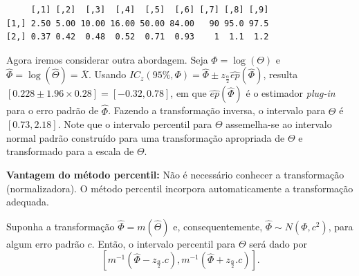 \documentclass[
  letterpaper,
  DIV=11,
  numbers=noendperiod]{scrreprt}
\begin{document}
\begin{verbatim}
     [,1] [,2]  [,3]  [,4]  [,5]  [,6] [,7] [,8] [,9]
[1,] 2.50 5.00 10.00 16.00 50.00 84.00   90 95.0 97.5
[2,] 0.37 0.42  0.48  0.52  0.71  0.93    1  1.1  1.2
\end{verbatim}

Agora iremos considerar outra abordagem. Seja \(\Phi=\log(\Theta)\) e
\(\hat\Phi=\log(\hat\Theta)=\bar{X}\). Usando
\(IC_z\left(95\%,\Phi \right)= \hat{\Phi} \pm z_{\frac{\alpha}{2}}\hat{ep}(\hat{\Phi})\),
resulta
\(\left[ 0.228 \pm 1.96 \times 0.28 \right]=\left[-0.32, 0.78\right]\),
em que \(\hat{ep}(\hat{\Phi})\) é o estimador \textit{plug-in} para o
erro padrão de \(\hat\Phi\). Fazendo a transformação inversa, o
intervalo para \(\Theta\) é \(\left[0.73, 2.18\right]\). Note que o
intervalo percentil para \(\Theta\) assemelha-se ao intervalo normal
padrão construído para uma transformação apropriada de \(\Theta\) e
transformado para a escala de \(\Theta\).

\begin{tcolorbox}[enhanced jigsaw, left=2mm, toprule=.15mm, opacityback=0, title=\textcolor{quarto-callout-important-color}{\faExclamation}\hspace{0.5em}{Importante}, leftrule=.75mm, breakable, colbacktitle=quarto-callout-important-color!10!white, coltitle=black, rightrule=.15mm, bottomtitle=1mm, toptitle=1mm, colframe=quarto-callout-important-color-frame, colback=white, opacitybacktitle=0.6, bottomrule=.15mm, arc=.35mm, titlerule=0mm]

\textbf{Vantagem do método percentil:} Não é necessário conhecer a
transformação (normalizadora). O método percentil incorpora
automaticamente a transformação adequada.

\end{tcolorbox}

\begin{tcolorbox}[enhanced jigsaw, left=2mm, toprule=.15mm, opacityback=0, title=\textcolor{quarto-callout-caution-color}{\faFire}\hspace{0.5em}{Lema}, leftrule=.75mm, breakable, colbacktitle=quarto-callout-caution-color!10!white, coltitle=black, rightrule=.15mm, bottomtitle=1mm, toptitle=1mm, colframe=quarto-callout-caution-color-frame, colback=white, opacitybacktitle=0.6, bottomrule=.15mm, arc=.35mm, titlerule=0mm]

Suponha a transformação \(\hat\Phi=m(\hat\Theta)\) e, consequentemente,
\(\hat\Phi\sim N(\Phi,c^2)\), para algum erro padrão \(c\). Então, o
intervalo percentil para \(\Theta\) será dado por
\[\left[ m^{-1}(\hat\Phi -z_{\frac{\alpha}{2}}.c), m^{-1}(\hat\Phi +z_{\frac{\alpha}{2}}.c)\right].\]

\end{tcolorbox}
\end{document}
